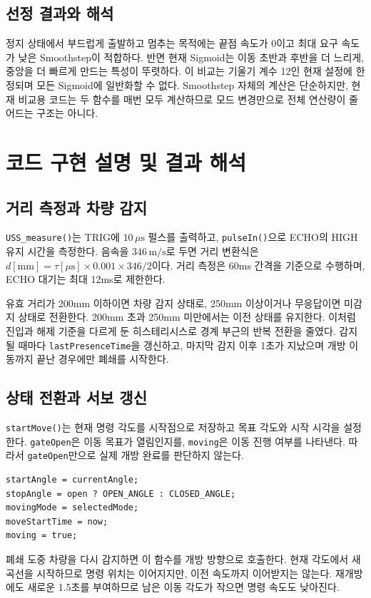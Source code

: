 \documentclass[a4paper,10pt]{article}
\begin{document}
\subsection{선정 결과와 해석}
정지 상태에서 부드럽게 출발하고 멈추는 목적에는 끝점 속도가 0이고 최대 요구 속도가
낮은 Smoothstep이 적합하다. 반면 현재 Sigmoid는 이동 초반과 후반을 더 느리게,
중앙을 더 빠르게 만드는 특성이 뚜렷하다. 이 비교는 기울기 계수 12인 현재 설정에
한정되며 모든 Sigmoid에 일반화할 수 없다. Smoothstep 자체의 계산은 단순하지만,
현재 비교용 코드는 두 함수를 매번 모두 계산하므로 모드 변경만으로 전체 연산량이
줄어드는 구조는 아니다.

\newpage
\section{코드 구현 설명 및 결과 해석}
\subsection{거리 측정과 차량 감지}
\texttt{USS\_measure()}는 TRIG에 $10\,\mu\mathrm{s}$ 펄스를 출력하고,
\texttt{pulseIn()}으로 ECHO의 HIGH 유지 시간을 측정한다.
음속을 $346\,\mathrm{m/s}$로 두면 거리 변환식은
$d[\mathrm{mm}]=\tau[\mu\mathrm{s}]\times0.001\times346/2$이다.
거리 측정은 60ms 간격을 기준으로 수행하며, ECHO 대기는 최대 12ms로 제한한다.

유효 거리가 200mm 이하이면 차량 감지 상태로, 250mm 이상이거나 무응답이면
미감지 상태로 전환한다. 200mm 초과 250mm 미만에서는 이전 상태를 유지한다.
이처럼 진입과 해제 기준을 다르게 둔 히스테리시스로 경계 부근의 반복 전환을 줄였다.
감지될 때마다 \texttt{lastPresenceTime}을 갱신하고, 마지막 감지 이후 1초가
지났으며 개방 이동까지 끝난 경우에만 폐쇄를 시작한다.

\subsection{상태 전환과 서보 갱신}
\texttt{startMove()}는 현재 명령 각도를 시작점으로 저장하고 목표 각도와 시작 시각을
설정한다. \texttt{gateOpen}은 이동 목표가 열림인지를, \texttt{moving}은 이동 진행 여부를
나타낸다. 따라서 \texttt{gateOpen}만으로 실제 개방 완료를 판단하지 않는다.
\begin{lstlisting}
startAngle = currentAngle;
stopAngle = open ? OPEN_ANGLE : CLOSED_ANGLE;
movingMode = selectedMode;
moveStartTime = now;
moving = true;
\end{lstlisting}
폐쇄 도중 차량을 다시 감지하면 이 함수를 개방 방향으로 호출한다.
현재 각도에서 새 곡선을 시작하므로 명령 위치는 이어지지만, 이전 속도까지
이어받지는 않는다. 재개방에도 새로운 1.5초를 부여하므로 남은 이동 각도가 작으면
명령 속도도 낮아진다.
\end{document}
